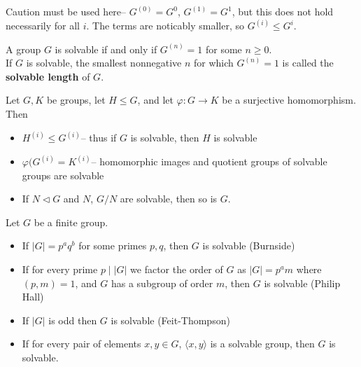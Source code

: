 \documentclass{memoir}
\begin{document}
Caution must be used here-- \(G^{(0)} = G^{0}\), \(G^{(1)}= G^{1}\), but this does not hold necessarily for all \(i\). The terms are noticably smaller, so \(G^{(i)}\leq G^{i}\).

\begin{thm}
	A group \(G\) is solvable if and only if \(G^{(n)}=1\) for some \(n\geq 0\).\\

	If \(G\) is solvable, the smallest nonnegative \(n\) for which \(G^{(n)}=1\) is called the \textbf{solvable length} of \(G\).
\end{thm}

\begin{prop}
	Let \(G, K\) be groups, let \(H\leq G\), and let \(\varphi :G\to K\) be a surjective homomorphism. Then
	\begin{itemize}
		\item \(H^{(i)}\leq G^{(i)}\)-- thus if \(G\) is solvable, then \(H\) is solvable
		\item \(\varphi (G^{(i)} = K^{(i)}\)-- homomorphic images and quotient groups of solvable groups are solvable
		\item If \(N \triangleleft G\) and \(N\), \(G / N\) are solvable, then so is \(G\).
	\end{itemize}
\end{prop}

\begin{thm}
	Let \(G\) be a finite group.
	\begin{itemize}
		\item If \(\left| G \right| = p^{a}q^{b}\) for some primes \(p,q\), then \(G\) is solvable (Burnside)\\
		\item If for every prime \(p \mid \left| G \right| \) we factor the order of \(G\) as \(\left| G \right| = p^{a}m\) where \((p,m) = 1\), and \(G\) has a subgroup of order \(m\), then \(G\) is solvable (Philip Hall)
		\item If \(\left| G \right| \) is odd then \(G\) is solvable (Feit-Thompson)
		\item If for every pair of elements \(x,y \in G\), \(\langle x,y \rangle \) is a solvable group, then \(G\) is solvable.
	\end{itemize}
\end{thm}


\end{document}
